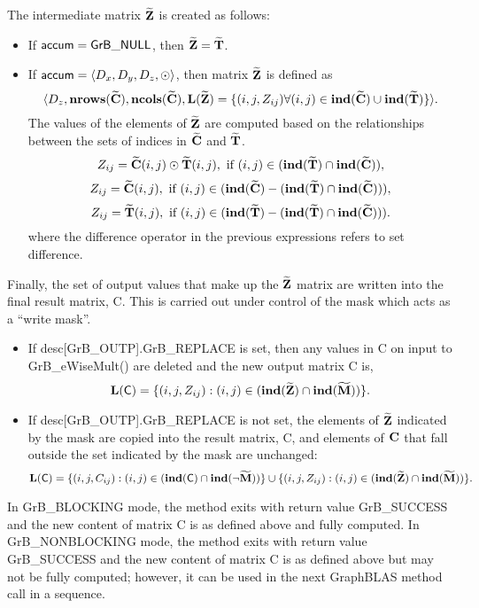 The intermediate matrix ${\bf \widetilde{Z}}$ is created as follows:
\begin{itemize}
    \item If ${\sf accum} = {\sf GrB\_NULL}$, then ${\bf \widetilde{Z}} = {\bf \widetilde{T}}$.

    \item If ${\sf accum} = \langle D_x, D_y, D_z, \odot \rangle$, then matrix ${\bf \widetilde{Z}}$ is defined as 
        \[ \langle D_z, \bold{nrows}({\bf \widetilde{C}}), \bold{ncols}({\bf \widetilde{C}}), \bold{L}({\bf \widetilde{Z}})
		= \{(i,j,Z_{ij})  \forall (i,j) \in \bold{ind}({\bf \widetilde{C}}) \cup 
        \bold{ind}({\bf \widetilde{T}}) \} \rangle.\]
    The values of the elements of ${\bf \widetilde{Z}}$ are computed based on the 
    relationships between the sets of indices in ${\bf \widetilde{C}}$ and 
    ${\bf \widetilde{T}}$.
\[
Z_{ij} = {\bf \widetilde{C}}(i,j) \odot {\bf \widetilde{T}}(i,j), \ \mbox{if}\  (i,j) \in  (\bold{ind}({\bf \widetilde{T}}) \cap \bold{ind}({\bf \widetilde{C}})),
\]
\[
Z_{ij} = \matrix{\widetilde{C}}(i,j), \ \mbox{if}\  (i,j) \in  (\bold{ind}(\matrix{\widetilde{C}}) - (\bold{ind}(\matrix{\widetilde{T}}) \cap \bold{ind}(\matrix{\widetilde{C}}))),
\]
\[
Z_{ij} = \matrix{\widetilde{T}}(i,j), \ \mbox{if}\  (i,j) \in  (\bold{ind}(\matrix{\widetilde{T}}) - (\bold{ind}(\matrix{\widetilde{T}}) \cap \bold{ind}(\matrix{\widetilde{C}}))).
\]
where the difference operator in the previous expressions refers to set difference.
\end{itemize}

Finally, the set of output values that make up the ${\bf \widetilde{Z}}$ 
matrix are written into the final result matrix, {\sf C}. 
This is carried out under control of the mask which acts as a ``write mask''.
\begin{itemize}
\item If {\sf desc[GrB\_OUTP].GrB\_REPLACE} is set, then any values in {\sf C} 
on input to {\sf GrB\_eWiseMult()} are deleted and the new output matrix {\sf C} is,
\[ \bold{L}({\sf C}) = \{(i,j,Z_{ij}) : (i,j) \in (\bold{ind}({\bf \widetilde{Z}}) 
\cap \bold{ind}({\bf \widetilde{M}})) \}. \]

\item If {\sf desc[GrB\_OUTP].GrB\_REPLACE} is not set, the elements of 
${\bf \widetilde{Z}}$ indicated by 
the mask are copied into the result matrix, {\sf C}, and elements of 
${\bf C}$ that fall outside the set indicated by the mask are unchanged:
\[ \bold{L}({\sf C}) = \{(i,j,C_{ij}) : (i,j) \in (\bold{ind}({\sf C}) 
\cap \bold{ind}(\neg {\bf \widetilde{M}})) \} \cup \{(i,j,Z_{ij}) : (i,j) \in 
(\bold{ind}({\bf \widetilde{Z}}) \cap \bold{ind}({\bf \widetilde{M}})) \}. \]
\end{itemize}

In {\sf GrB\_BLOCKING} mode, the method exits with return value 
{\sf GrB\_SUCCESS} and the new content of matrix {\sf C} is as defined above
and fully computed.  
In {\sf GrB\_NONBLOCKING} mode, the method exits with return value 
{\sf GrB\_SUCCESS} and the new content of matrix {\sf C} is as defined above 
but may not be fully computed; however, it can be used in the next GraphBLAS 
method call in a sequence.
